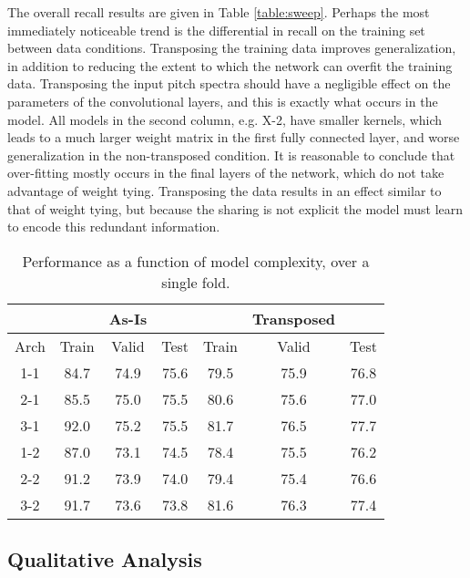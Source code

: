 The overall recall results are given in Table \ref{table:sweep}.
Perhaps the most immediately noticeable trend is the differential in recall on the training set between data conditions.
Transposing the training data improves generalization, in addition to reducing the extent to which the network can overfit the training data.
Transposing the input pitch spectra should have a negligible effect on the parameters of the convolutional layers, and this is exactly what occurs in the model.
All models in the second column, e.g. X-2, have smaller kernels, which leads to a much larger weight matrix in the first fully connected layer, and worse generalization in the non-transposed condition.
It is reasonable to conclude that over-fitting mostly occurs in the final layers of the network, which do not take advantage of weight tying.
Transposing the data results in an effect similar to that of weight tying, but because the sharing is not explicit the model must learn to encode this redundant information.


\begin{table}[!t]
\caption{Performance as a function of model complexity, over a single fold.}
\label{table:exp2res}
\centering
\begin{tabular}{ c || c c c || c c c |}
& & As-Is & & & Transposed & \\
 \hline
Arch & Train & Valid & Test & Train & Valid & Test \\
\hline
1-1 & 84.7 & 74.9 & 75.6 & 79.5 & 75.9 & 76.8 \\
2-1 & 85.5 & 75.0 & 75.5 & 80.6 & 75.6 & 77.0 \\
3-1 & 92.0 & 75.2 & 75.5 & 81.7 & 76.5 & 77.7 \\
\hline
1-2 & 87.0 & 73.1 & 74.5 & 78.4 & 75.5 & 76.2 \\
2-2 & 91.2 & 73.9 & 74.0 & 79.4 & 75.4 & 76.6 \\
3-2 & 91.7 & 73.6 & 73.8 & 81.6 & 76.3 & 77.4 \\
\hline
\end{tabular}
\end{table}


\subsection{Qualitative Analysis}
\label{subsec:Qualitative_analysis}

